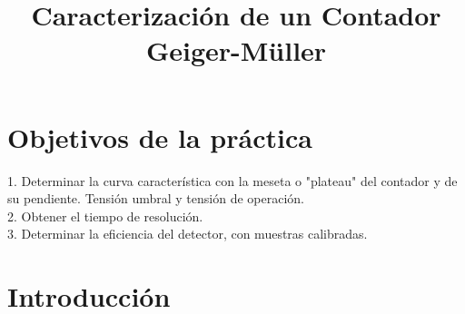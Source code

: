 \documentclass[a4paper,12pt,spanish]{article}
\begin{document}
	
	
	\title{Caracterización de un Contador Geiger-Müller}
	
	\date{}
	
	\maketitle
	
	
	
	
	
	
	
	
	

	

	
	\section{Objetivos de la práctica}
	
	\vspace{\baselineskip}
	
	1. Determinar la curva característica con la meseta o "plateau" del contador y de su pendiente. Tensión umbral y tensión de operación.\\
	
	2. Obtener el tiempo de resolución.\\
	
	3. Determinar la eficiencia del detector, con muestras calibradas.\\
	
	
	\iffalse
	\section{Introducción}
	
\end{document}
